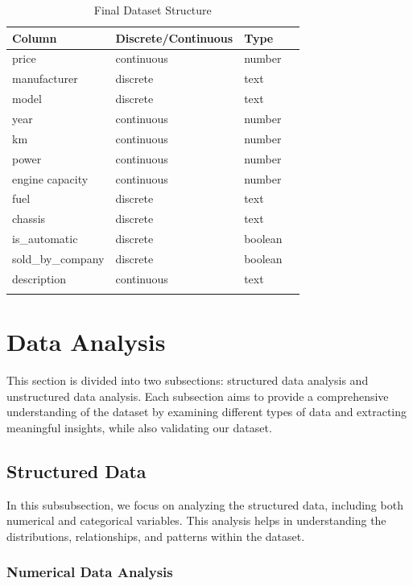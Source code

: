 \begin{longtable}{llll}
    \textbf{Column} & \textbf{Discrete/Continuous} & \textbf{Type} \\ \hline
    price & continuous & number \\ \hline
    manufacturer & discrete & text  \\ \hline
    model & discrete  & text \\ \hline
    year & continuous & number \\ \hline
    km & continuous & number \\ \hline
    power & continuous  & number \\ \hline
    engine capacity & continuous & number \\ \hline
    fuel & discrete & text \\ \hline
    chassis & discrete & text \\ \hline
    is\_automatic & discrete & boolean \\ \hline
    sold\_by\_company & discrete & boolean \\ \hline
    description & continuous & text \\ \hline
    \caption{Final Dataset Structure}
    \label{tab:cleaned-table}
\end{longtable}


\section{Data Analysis}
This section is divided into two subsections: structured data analysis and unstructured data analysis. Each subsection aims to provide a comprehensive understanding of the dataset by examining different types of data and extracting meaningful insights, while also validating our dataset.

\subsection{Structured Data}
In this subsubsection, we focus on analyzing the structured data, including both numerical and categorical variables. This analysis helps in understanding the distributions, relationships, and patterns within the dataset.

\subsubsection{Numerical Data Analysis}


